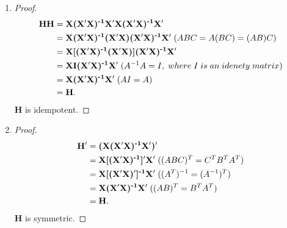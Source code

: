\documentclass[10pt]{article}
\begin{document}
\begin{enumerate}[1)]
\item
\begin{proof}
\begin{align*}
\textbf{HH}&=\textbf{X(X\textsuperscript{$\prime$}X)\textsuperscript{-1}X\textsuperscript{$\prime$}X(X\textsuperscript{$\prime$}X)\textsuperscript{-1}X\textsuperscript{$\prime$}}\\
&=\textbf{X(X\textsuperscript{$\prime$}X)\textsuperscript{-1}(X\textsuperscript{$\prime$}X)(X\textsuperscript{$\prime$}X)\textsuperscript{-1}X\textsuperscript{$\prime$}}\;(ABC=A(BC)=(AB)C)\\
&=\textbf{X[(X\textsuperscript{$\prime$}X)\textsuperscript{-1}(X\textsuperscript{$\prime$}X)](X\textsuperscript{$\prime$}X)\textsuperscript{-1}X\textsuperscript{$\prime$}}\\
&=\textbf{XI(X\textsuperscript{$\prime$}X)\textsuperscript{-1}X\textsuperscript{$\prime$}}\;(A^{-1}A=I,\;where\;I\;is\;an\;idenety\;matrix)\\
&=\textbf{X(X\textsuperscript{$\prime$}X)\textsuperscript{-1}X\textsuperscript{$\prime$}}\;(AI=A)\\
&=\textbf{H}.
\end{align*}
\textbf{H} is idempotent.
\end{proof}
\vspace{3mm}

\item
\begin{proof}
\begin{align*}
\textbf{H\textsuperscript{$\prime$}}&=\textbf{(X(X\textsuperscript{$\prime$}X)\textsuperscript{-1}X\textsuperscript{$\prime$})\textsuperscript{$\prime$}}\\
&=\textbf{X[(X\textsuperscript{$\prime$}X)\textsuperscript{-1}]\textsuperscript{$\prime$}X\textsuperscript{$\prime$}}\;((ABC)^T=C^TB^TA^T)\\
&=\textbf{X[(X\textsuperscript{$\prime$}X)\textsuperscript{$\prime$}]\textsuperscript{-1}X\textsuperscript{$\prime$}}\;((A^T)^{-1}=(A^{-1})^T)\\
&=\textbf{X(X\textsuperscript{$\prime$}X)\textsuperscript{-1}X\textsuperscript{$\prime$}}\;((AB)^T=B^TA^T)\\
&=\textbf{H}.
\end{align*}
\textbf{H} is symmetric.
\end{proof}
\vspace{3mm}

\end{enumerate}

\color{Gray}
\end{document}
